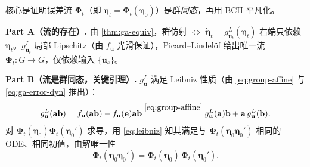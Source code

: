 \begin{derivation}
\label{deriv:log-linear}
核心是证明误差流 $\boldsymbol{\Phi}_t$（即 $\boldsymbol{\eta}_t=\boldsymbol{\Phi}_t(\boldsymbol{\eta}_0)$）是群\emph{同态}，再用 BCH 平凡化。

\textbf{Part A（流的存在）.}\; 由 \cref{thm:ga-equiv}，群仿射 $\Leftrightarrow$ $\dot{\boldsymbol{\eta}}_t=g^L_{\mathbf{u}_t}(\boldsymbol{\eta}_t)$ 右端只依赖 $\boldsymbol{\eta}_t$。$g^L_{\mathbf{u}_t}$ 局部 Lipschitz（由 $f_{\mathbf{u}}$ 光滑保证），Picard--Lindelöf 给出唯一流 $\boldsymbol{\Phi}_t:G\to G$，仅依赖输入 $\{\mathbf{u}_s\}$。

\textbf{Part B（流是群同态，关键引理）.}\; $g^L_{\mathbf{u}}$ 满足 Leibniz 性质（由 \cref{eq:group-affine} 与 \cref{eq:ga-error-dyn} 推出）：
\begin{equation}
  g^L_{\mathbf{u}}(\mathbf{a}\mathbf{b})=f_{\mathbf{u}}(\mathbf{a}\mathbf{b})-f_{\mathbf{u}}(\mathbf{e})\mathbf{a}\mathbf{b}
  \overset{\cref{eq:group-affine}}{=}g^L_{\mathbf{u}}(\mathbf{a})\mathbf{b}+\mathbf{a}\,g^L_{\mathbf{u}}(\mathbf{b}).
  \label{eq:leibniz}
\end{equation}
对 $\boldsymbol{\Phi}_t(\boldsymbol{\eta}_0)\boldsymbol{\Phi}_t(\boldsymbol{\eta}_0')$ 求导，用 \cref{eq:leibniz} 知其满足与 $\boldsymbol{\Phi}_t(\boldsymbol{\eta}_0\boldsymbol{\eta}_0')$ 相同的 ODE、相同初值，由解唯一性
\begin{equation}
  \boldsymbol{\Phi}_t(\boldsymbol{\eta}_0\boldsymbol{\eta}_0')=\boldsymbol{\Phi}_t(\boldsymbol{\eta}_0)\,\boldsymbol{\Phi}_t(\boldsymbol{\eta}_0').
  \label{eq:flow-homo}
\end{equation}


\end{derivation}
